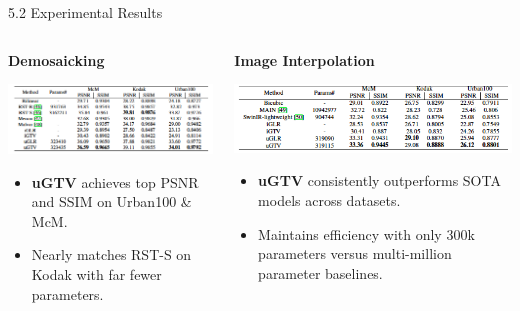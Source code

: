 \documentclass[aspectratio=169,xcolor=dvipsnames]{beamer}
\begin{document}
\begin{frame}{5.2 Experimental Results}

\begin{columns}[c]

\begin{column}{0.48\textwidth}
    \textbf{Demosaicking} \\[0.2cm]
    
    \begin{center}
        \includegraphics[width=\linewidth]{Demosaicking_results.png}
    \end{center}

    \vspace{0.2cm}
    \begin{itemize}
        \item \textbf{uGTV} achieves top PSNR and SSIM on Urban100 \& McM.
        \item Nearly matches RST-S on Kodak with far fewer parameters.
    \end{itemize}
\end{column}

\begin{column}{0.48\textwidth}
    \textbf{Image Interpolation} \\[0.2cm]

    \begin{center}
        \includegraphics[width=\linewidth]{Interpolation_results.png}
    \end{center}

    \vspace{0.2cm}
    \begin{itemize}
        \item \textbf{uGTV} consistently outperforms SOTA models across datasets.
        \item Maintains efficiency with only 300k parameters versus multi-million parameter baselines.
    \end{itemize}
\end{column}

\end{columns}

\end{frame}
\end{document}
